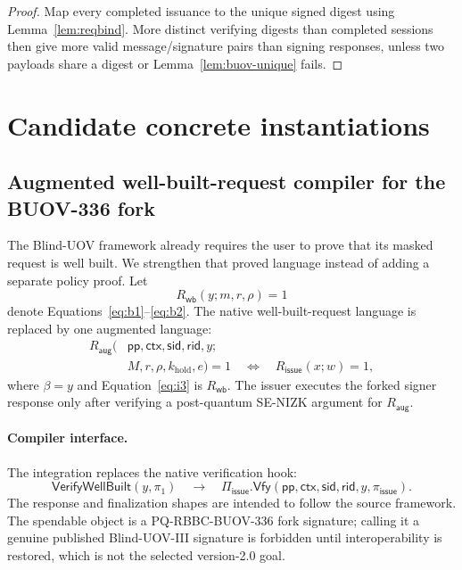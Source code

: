 \documentclass[11pt]{article}
\newcommand{\Piiss}{\Pi_{\mathsf{issue}}}
\newcommand{\rid}{\mathsf{rid}}
\newcommand{\ctx}{\mathsf{ctx}}
\newcommand{\pp}{\mathsf{pp}}
\begin{document}
\begin{proof}
Map every completed issuance to the unique signed digest using
Lemma~\ref{lem:reqbind}.  More distinct verifying digests than completed
sessions then give more valid message/signature pairs than signing responses,
unless two payloads share a digest or Lemma~\ref{lem:buov-unique} fails.
\end{proof}

\section{Candidate concrete instantiations}

\subsection{Augmented well-built-request compiler for the BUOV-336 fork}\label{sec:augcap}

The Blind-UOV framework already requires the user to prove that its masked
request is well built.  We strengthen that proved language instead of adding a
separate policy proof.  Let
\[
  R_{\mathsf{wb}}(y;m,r,\rho)=1
\]
denote Equations~\eqref{eq:b1}--\eqref{eq:b2}.  The native
well-built-request language is replaced by one augmented language:
\begin{align*}
 R_{\mathsf{aug}}(&\pp,\ctx,\mathsf{sid},\rid,y;\\
                  &M,r,\rho,k_{\mathrm{hold}},e)=1
 \quad\Longleftrightarrow\quad
 R_{\mathsf{issue}}(x;w)=1,
\end{align*}
where $\beta=y$ and Equation~\eqref{eq:i3} is $R_{\mathsf{wb}}$.  The issuer
executes the forked signer response only
after verifying a post-quantum SE-NIZK argument for $R_{\mathsf{aug}}$.

\paragraph{Compiler interface.}
The integration replaces the native verification hook:
\[
 \mathsf{VerifyWellBuilt}(y,\pi_1)
 \quad\longrightarrow\quad
 \Piiss.\mathsf{Vfy}(\pp,\ctx,\mathsf{sid},\rid,y,
                    \pi_{\mathsf{issue}}).
\]
The response and finalization shapes are intended to follow the source
framework.  The spendable object is a PQ-RBBC-BUOV-336 fork signature; calling
it a genuine published Blind-UOV-III signature is forbidden until
interoperability is restored, which is not the selected version-2.0 goal.
\end{document}
